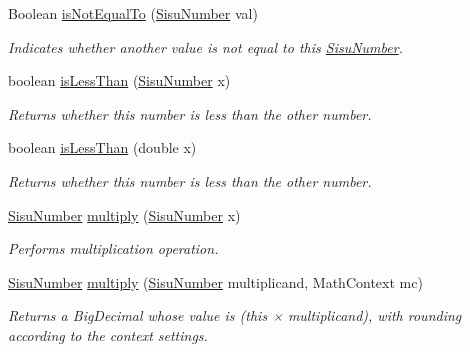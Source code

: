 \begin{DoxyCompactItemize}
Boolean \hyperlink{classcom_1_1aarrelaakso_1_1drawl_1_1_sisu_number_ac6a98976517d96b810341475ad54789e}{is\+Not\+Equal\+To} (\hyperlink{classcom_1_1aarrelaakso_1_1drawl_1_1_sisu_number}{Sisu\+Number} val)
\begin{DoxyCompactList}\small\item\em Indicates whether another value is not equal to this \hyperlink{classcom_1_1aarrelaakso_1_1drawl_1_1_sisu_number}{Sisu\+Number}. \end{DoxyCompactList}\item 
boolean \hyperlink{classcom_1_1aarrelaakso_1_1drawl_1_1_sisu_number_ac69dc7ba5fec07d8e51db8d2d6cd00fb}{is\+Less\+Than} (\hyperlink{classcom_1_1aarrelaakso_1_1drawl_1_1_sisu_number}{Sisu\+Number} x)
\begin{DoxyCompactList}\small\item\em Returns whether this number is less than the other number. \end{DoxyCompactList}\item 
boolean \hyperlink{classcom_1_1aarrelaakso_1_1drawl_1_1_sisu_number_afd65143333e3b7bbaa54f842e2cb9408}{is\+Less\+Than} (double x)
\begin{DoxyCompactList}\small\item\em Returns whether this number is less than the other number. \end{DoxyCompactList}\item 
\hyperlink{classcom_1_1aarrelaakso_1_1drawl_1_1_sisu_number}{Sisu\+Number} \hyperlink{classcom_1_1aarrelaakso_1_1drawl_1_1_sisu_number_a75d9ca20aa1f3a990167780cdebc9473}{multiply} (\hyperlink{classcom_1_1aarrelaakso_1_1drawl_1_1_sisu_number}{Sisu\+Number} x)
\begin{DoxyCompactList}\small\item\em Performs multiplication operation. \end{DoxyCompactList}\item 
\hyperlink{classcom_1_1aarrelaakso_1_1drawl_1_1_sisu_number}{Sisu\+Number} \hyperlink{classcom_1_1aarrelaakso_1_1drawl_1_1_sisu_number_a82a13705ee2fdb2beb14e9cbb6bbd8a5}{multiply} (\hyperlink{classcom_1_1aarrelaakso_1_1drawl_1_1_sisu_number}{Sisu\+Number} multiplicand, Math\+Context mc)
\begin{DoxyCompactList}\small\item\em Returns a Big\+Decimal whose value is (this × multiplicand), with rounding according to the context settings. \end{DoxyCompactList}\item 

\end{DoxyCompactItemize}
